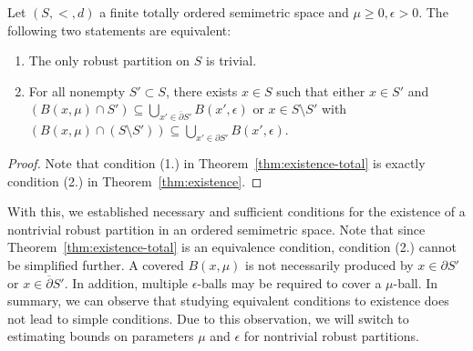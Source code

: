 \begin{corollary}
    \label{cor:existence-total}
    Let $(S, <, d)$ a finite totally ordered semimetric space and $\mu \geq 0, \epsilon > 0$. The following two statements are equivalent:
    \begin{enumerate}
        \item The only robust partition on $S$ is trivial.
        \item For all nonempty $S' \subset S$, there exists $x \in S$ such that either $x \in S'$ and $(B(x,\mu) \cap S') \subseteq \bigcup_{x' \in \overline{\partial}S'} B(x', \epsilon)$ or $x \in S \setminus S'$ with $(B(x,\mu) \cap (S \setminus S')) \subseteq \bigcup_{x' \in \partial S'} B(x', \epsilon)$.
    \end{enumerate}
\end{corollary}
\begin{proof}
    Note that condition (1.) in Theorem~\ref{thm:existence-total} is exactly condition (2.) in Theorem~\ref{thm:existence}.
\end{proof}

With this, we established necessary and sufficient conditions for the existence of a nontrivial robust partition in an ordered semimetric space. Note that since Theorem~\ref{thm:existence-total} is an equivalence condition, condition (2.) cannot be simplified further. A covered $B(x, \mu)$ is not necessarily produced by $x \in \partial S'$ or $x \in \overline{\partial} S'$. In addition, multiple $\epsilon$-balls may be required to cover a $\mu$-ball. In summary, we can observe that studying equivalent conditions to existence does not lead to simple conditions. Due to this observation, we will switch to estimating bounds on parameters $\mu$ and $\epsilon$ for nontrivial robust partitions.



